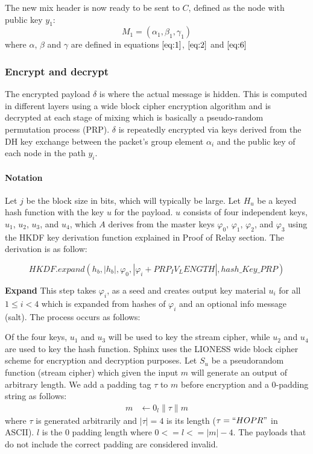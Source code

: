 The new mix header is now ready to be sent to $C$, defined as the node with public key $y_1$:
$$M_1=(\alpha_1,\beta_1,\gamma_1)$$
where $\alpha$, $\beta$ and $\gamma$ are defined in equations $\ref{eq:1}$, $\ref{eq:2}$ and $\ref{eq:6}$

\subsubsection{Encrypt and decrypt}
The encrypted payload $\delta$ is where the actual message is hidden. This is computed in different layers using a wide block cipher encryption algorithm and is decrypted at each stage of mixing which is basically a pseudo-random permutation process (PRP).
$\delta$ is repeatedly encrypted via keys derived from the DH key exchange between the packet’s group element $\alpha_i$ and the public key of each node in the path $y_i$.

\paragraph{Notation}
Let $j$ be the block size in bits, which will typically be large. Let $H_u$ be a keyed hash function with the key $u$ for the payload. $u$ consists of four independent keys, $u_1$, $u_2$, $u_3$, and $u_4$, which $A$ derives from the master keys $\varphi_0$, $\varphi_1$, $\varphi_2$, and $\varphi_3$ using the HKDF key derivation function explained in Proof of Relay section. The derivation is as follow:

        $$HKDF.expand(h_b, |h_b|,\varphi_0, |\varphi_i + PRP_IV_LENGTH|, hash\_Key\_PRP)$$
     
 
\textbf{Expand} This step takes $\varphi_i$, as a seed and creates output key material $u_i$ for all $1\le i < 4 $ which is expanded from hashes of $\varphi_i$ and an optional info message (salt). The process occurs as follows:

Of the four keys, $u_1$ and $u_3$ will be used to key the stream cipher, while $u_2$ and $u_4$ are used to key the hash function. Sphinx uses the LIONESS wide block cipher scheme for encryption and decryption purposes.
Let $S_u$ be a pseudorandom function (stream cipher) which given the input $m$ will generate an output of arbitrary length. We add a padding tag $\tau$ to $m$ before encryption and a 0-padding string as follows:
\begin{align}
   m &\leftarrow 0_{l} \|\tau\|m
    \end{align}
where $\tau$ is generated arbitrarily and $|\tau|=4$ is its length ($\tau=``HOPR "$ in ASCII). $l$ is the $0$ padding length where
$0 <= l <= |m| - 4$. The payloads that do not include the correct padding are considered invalid.

